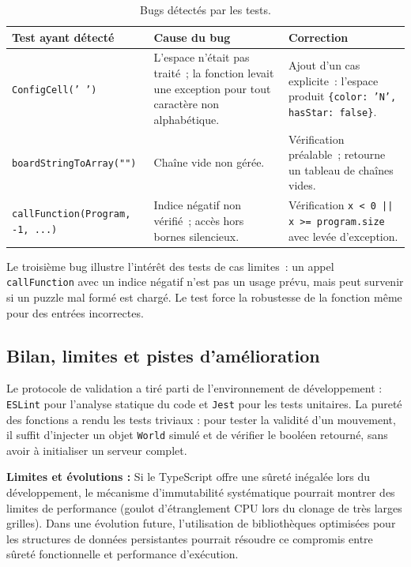 \documentclass[12pt,a4paper]{article}
\begin{document}
\begin{table}[H]
\centering
\renewcommand{\arraystretch}{1.4}
\begin{tabular}{p{3.5cm} p{4cm} p{4.5cm}}
\toprule
Test ayant détecté & Cause du bug & Correction \\
\midrule
\texttt{ConfigCell(' ')}
& L'espace n'était pas traité~; la fonction levait une exception pour tout caractère non alphabétique.
& Ajout d'un cas explicite~: l'espace produit \texttt{\{color: 'N', hasStar: false\}}. \\
\addlinespace
\texttt{boardString\-To\-Array("")} & Chaîne vide non gérée. & Vérification préalable~; retourne un tableau de chaînes vides. \\
\addlinespace
\texttt{callFunction\-(Program, -1, ...)\-}
& Indice négatif non vérifié~; accès hors bornes silencieux.
& Vérification \texttt{x < 0 || x >= program.size} avec levée d'exception. \\
\bottomrule
\end{tabular}
\caption{Bugs détectés par les tests.}
\label{tab:r-bugs}
\end{table}
 
Le troisième bug illustre l'intérêt des tests de cas limites~: un
appel \texttt{callFunction} avec un indice négatif n'est pas un usage
prévu, mais peut survenir si un puzzle mal formé est chargé. Le test
force la robustesse de la fonction même pour des entrées incorrectes.
 
\subsection{Bilan, limites et pistes d'amélioration}
\label{subsec:r-limites}

Le protocole de validation a tiré parti de l'environnement de développement : \texttt{ESLint} pour l'analyse statique du code et \texttt{Jest} pour les tests unitaires. La pureté des fonctions a rendu les tests triviaux : pour tester la validité d'un mouvement, il suffit d'injecter un objet \texttt{World} simulé et de vérifier le booléen retourné, sans avoir à initialiser un serveur complet.

\textbf{Limites et évolutions :} Si le TypeScript offre une sûreté inégalée lors du développement, le mécanisme d'immutabilité systématique pourrait montrer des limites de performance (goulot d'étranglement CPU lors du clonage de très larges grilles). Dans une évolution future, l'utilisation de bibliothèques optimisées pour les structures de données persistantes pourrait résoudre ce compromis entre sûreté fonctionnelle et performance d'exécution.
 
\end{document}
